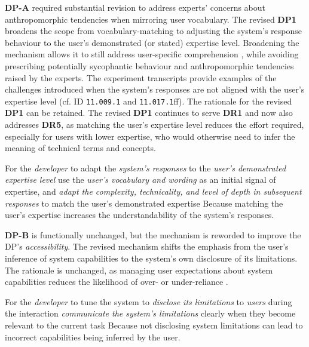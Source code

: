 \textbf{DP-A} required substantial revision to address experts' concerns about anthropomorphic tendencies when mirroring user vocabulary. The revised \textbf{DP1} broadens the scope from vocabulary-matching to adjusting the system's response behaviour to the user's demonstrated (or stated) expertise level. Broadening the mechanism allows it to still address user-specific comprehension \parencite{Shin2021}, while avoiding prescribing potentially sycophantic behaviour \parencite{Sharma2024} and anthropomorphic tendencies \parencite[cf.][]{Weisz2025} raised by the experts. The experiment transcripts provide examples of the challenges introduced when the system's responses are not aligned with the user's expertise level (cf. ID \texttt{11.009.1} and \texttt{11.017.1}ff). The rationale for the revised \textbf{DP1} can be retained. The revised \textbf{DP1} continues to serve \textbf{DR1} and now also addresses \textbf{DR5}, as matching the user's expertise level reduces the effort required, especially for users with lower expertise, who would otherwise need to infer the meaning of technical terms and concepts.

    {For the \textit{developer} to adapt the \textit{system's responses} to the \textit{user's demonstrated expertise level}}
    {use the \textit{user's vocabulary and wording} as an initial signal of expertise, and \textit{adapt the complexity, technicality, and level of depth in subsequent responses} to match the user's demonstrated expertise}
    {Because matching the user's expertise increases the understandability of the system's responses.}

\textbf{DP-B} is functionally unchanged, but the mechanism is reworded to improve the \ac{DP}'s \textit{accessibility}. The revised mechanism shifts the emphasis from the user's inference of system capabilities to the system's own disclosure of its limitations. The rationale is unchanged, as managing user expectations about system capabilities reduces the likelihood of over- or under-reliance \parencite[cf.][]{Jussupow2021}.

    {For the \textit{developer} to tune the system to \textit{disclose its limitations} to \textit{users} during the interaction}
    {\textit{communicate the system's limitations} clearly when they become relevant to the current task}
    {Because not disclosing system limitations can lead to incorrect capabilities being inferred by the user.}


